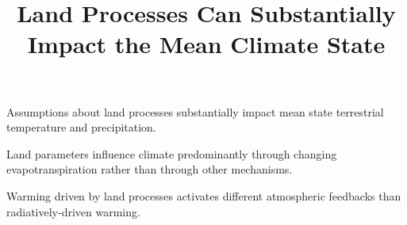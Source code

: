 \documentclass[draft]{agujournal2019}
\begin{document}
\title{Land Processes Can Substantially Impact the Mean Climate State
}







\begin{keypoints}
\item Assumptions about land processes substantially impact mean state terrestrial temperature and precipitation.
\item Land parameters influence climate predominantly through changing evapotranspiration rather than through other mechanisms.
\item Warming driven by land processes activates different atmospheric feedbacks than radiatively-driven warming.
\end{keypoints}
\end{document}
